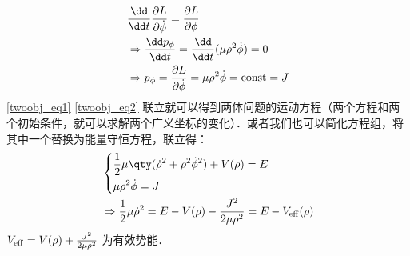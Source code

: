 \begin{equation}\label{twoobj_eq2}
\begin{aligned}
&\frac{\dd }{\dd t}\frac{\partial L}{\partial \dot\phi}=\frac{\partial L}{\partial \phi}\\&
\Rightarrow \frac{\dd p_\phi}{\dd t}=\frac{\dd }{\dd t}(\mu \rho^2\dot\phi)=0
\\&
\Rightarrow p_\phi=\frac{\partial L}{\partial \dot \phi}=\mu\rho^2\dot\phi ={\rm const}=J 
\end{aligned}
\end{equation}
\autoref{twoobj_eq1} \autoref{twoobj_eq2} 联立就可以得到两体问题的运动方程（两个方程和两个初始条件，就可以求解两个广义坐标的变化）．或者我们也可以简化方程组，将其中一个替换为能量守恒方程，联立得：
\begin{equation}
\begin{aligned}
&\left\{
\begin{aligned}
&\frac{1}{2}\mu \qty(\dot\rho^2+\rho^2\dot\phi^2)+V(\rho)=E\\
&\mu\rho^2\dot\phi=J
\end{aligned}
\right.\\
&\Rightarrow \frac{1}{2}\mu \dot\rho^2=E-V(\rho)-\frac{J^2}{2\mu\rho^2}=E-V_{\rm{eff}}(\rho)
\end{aligned}
\end{equation}
$V_{\rm{eff}}=V(\rho)+\frac{J^2}{2\mu\rho^2}$ 为有效势能．